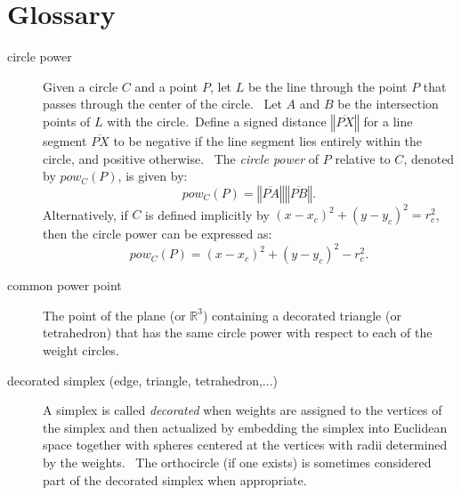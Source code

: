                       


\chapter{Glossary}

\begin{description}
\item[circle power] Given a circle $C$ and a point $P$, let $L$ be the line
through the point $P$ that passes through the center of the circle. \ Let $A$
and $B$ be the intersection points of $L$ with the circle.\ Define a signed
distance $\left\Vert \overline{PX}\right\Vert $ for a line segment $%
\overline{PX}$ to be negative if the line segment lies entirely within the
circle, and positive otherwise. \ The \textit{circle power} of $P$ relative
to $C$, denoted by $pow_{C}\left( P\right) $, is given by:%
\begin{equation*}
pow_{C}\left( P\right) =\left\Vert \overline{PA}\right\Vert \left\Vert 
\overline{PB}\right\Vert .
\end{equation*}%
Alternatively, if $C$ is defined implicitly by $\left( x-x_{c}\right)
^{2}+\left( y-y_{c}\right) ^{2}=r_{c}^{2}$, then the circle power can be
expressed as:%
\begin{equation*}
pow_{C}\left( P\right) =\left( x-x_{c}\right) ^{2}+\left( y-y_{c}\right)
^{2}-r_{c}^{2}.
\end{equation*}

\item[common power point] The point of the plane (or $%
\mathbb{R}
^{3}$) containing a decorated triangle (or tetrahedron) that has the same
circle power with respect to each of the weight circles. \ 

\item[decorated simplex (edge, triangle, tetrahedron,...)] A simplex is
called \textit{decorated} when weights are assigned to the vertices of the
simplex and then actualized by embedding the simplex into Euclidean space
together with spheres centered at the vertices with radii determined by the
weights. \ The orthocircle (if one exists) is sometimes considered part of
the decorated simplex when appropriate.


\end{description}
